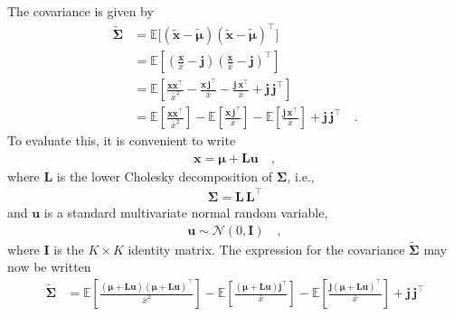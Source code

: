 \documentclass[modern]{aastex62}
\begin{document}
The covariance is given by
%
\begin{align}
    \tilde{\pmb{\Sigma}}
     & =
    \mathbb{E}\big[ (\tilde{\mathbf{x}} - \tilde{\pmb{\mu}}) (\tilde{\mathbf{x}} - \tilde{\pmb{\mu}} )^\top \big]
    \nonumber \\[0.5em]
     & =
    \mathbb{E}\left[
        \left(\frac{\mathbf{x}}{\bar{x}} - \mathbf{j}\right)
        \left(\frac{\mathbf{x}}{\bar{x}} - \mathbf{j}\right)^\top
        \right]
    \nonumber \\[0.5em]
     & =
    \mathbb{E}\left[
        \frac{\mathbf{x}\mathbf{x}^\top}{\bar{x}^2}
        -
        \frac{\mathbf{x}\,\mathbf{j}^\top}{\bar{x}}
        -
        \frac{\mathbf{j}\,\mathbf{x}^\top}{\bar{x}}
        +
        \mathbf{j} \, \mathbf{j}^\top
        \right]
    \nonumber \\[0.5em]
     & =
    \mathbb{E}\left[
        \frac{\mathbf{x}\mathbf{x}^\top}{\bar{x}^2}
        \right]
    -
    \mathbb{E}\left[
        \frac{\mathbf{x}\,\mathbf{j}^\top}{\bar{x}}
        \right]
    -
    \mathbb{E}\left[
        \frac{\mathbf{j}\,\mathbf{x}^\top}{\bar{x}}
        \right]
    +
    \mathbf{j} \, \mathbf{j}^\top
    \quad.
\end{align}
%
To evaluate this, it is convenient to write
%
\begin{align}
    \mathbf{x} = \pmb{\mu} + \mathbf{L} \mathbf{u}
    \quad,
\end{align}
%
where $\mathbf{L}$ is the lower Cholesky decomposition of $\pmb{\Sigma}$,
i.e.,
%
\begin{align}
    \pmb{\Sigma} = \mathbf{L}\,\mathbf{L}^\top
\end{align}
%
and $\mathbf{u}$ is a standard multivariate normal random variable,
%
\begin{align}
    \mathbf{u} \sim \mathcal{N}\left( 0, \mathbf{I} \right)
    \quad,
\end{align}
%
where $\mathbf{I}$ is the
$K \times K$ identity matrix.
The expression for the covariance $\tilde{\pmb{\Sigma}}$ may now be written
%
\begin{align}
    \label{eq:SigmaTildeExp}
    \tilde{\pmb{\Sigma}}
     & =
    \mathbb{E}\left[
        \frac{
            (\pmb{\mu} + \mathbf{L} \mathbf{u})(\pmb{\mu} + \mathbf{L} \mathbf{u})^\top
        }{
            \bar{x}^2
        }
        \right]
    -
    \mathbb{E}\left[
        \frac{
            (\pmb{\mu} + \mathbf{L} \mathbf{u})\mathbf{j}^\top
        }{
            \bar{x}
        }
        \right]
    -
    \mathbb{E}\left[
        \frac{
            \mathbf{j}(\pmb{\mu} + \mathbf{L} \mathbf{u})^\top
        }{
            \bar{x}
        }
        \right]
    +
    \mathbf{j} \, \mathbf{j}^\top
\end{align}
\end{document}
